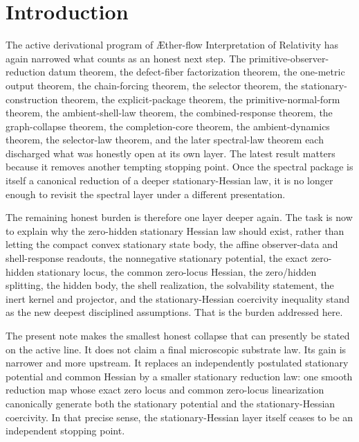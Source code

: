 \documentclass[11pt]{article}
\newcommand{\Aflow}{\AE{}ther-flow}
\newcommand{\TheoryName}{\Aflow{} Interpretation of Relativity}
\begin{document}
\section{Introduction}

The active derivational program of \TheoryName{} has again narrowed what counts as an honest next step. The primitive-observer-reduction datum theorem, the defect-fiber factorization theorem, the one-metric output theorem, the chain-forcing theorem, the selector theorem, the stationary-construction theorem, the explicit-package theorem, the primitive-normal-form theorem, the ambient-shell-law theorem, the combined-response theorem, the graph-collapse theorem, the completion-core theorem, the ambient-dynamics theorem, the selector-law theorem, and the later spectral-law theorem each discharged what was honestly open at its own layer. The latest result matters because it removes another tempting stopping point. Once the spectral package is itself a canonical reduction of a deeper stationary-Hessian law, it is no longer enough to revisit the spectral layer under a different presentation.

The remaining honest burden is therefore one layer deeper again. The task is now to explain why the zero-hidden stationary Hessian law should exist, rather than letting the compact convex stationary state body, the affine observer-data and shell-response readouts, the nonnegative stationary potential, the exact zero-hidden stationary locus, the common zero-locus Hessian, the zero/hidden splitting, the hidden body, the shell realization, the solvability statement, the inert kernel and projector, and the stationary-Hessian coercivity inequality stand as the new deepest disciplined assumptions. That is the burden addressed here.

The present note makes the smallest honest collapse that can presently be stated on the active line. It does not claim a final microscopic substrate law. Its gain is narrower and more upstream. It replaces an independently postulated stationary potential and common Hessian by a smaller stationary reduction law: one smooth reduction map whose exact zero locus and common zero-locus linearization canonically generate both the stationary potential and the stationary-Hessian coercivity. In that precise sense, the stationary-Hessian layer itself ceases to be an independent stopping point.
\end{document}
